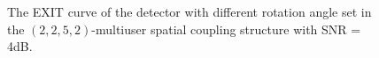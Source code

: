 \documentclass[conference]{IEEEtran}
\begin{document}
\begin{figure}[h!]
\setlength{\abovecaptionskip}{0.cm}
\setlength{\belowcaptionskip}{-0.cm}
  \caption{The EXIT curve of the detector with different rotation angle set in the $\left( {2,2,5,2} \right)$-multiuser spatial coupling structure with SNR = 4dB.}\label{fig.7}
    \vspace{-0.5em}
\end{figure}
\end{document}
